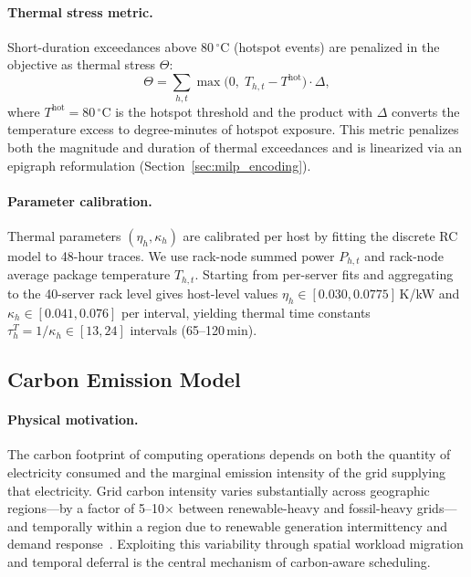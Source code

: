 \documentclass[a4paper,fleqn]{cas-dc}
\begin{document}
\paragraph{Thermal stress metric.}
Short-duration exceedances above 80$\,^{\circ}$C (hotspot events) are penalized in the objective as thermal stress $\Theta$:
\begin{equation}
\label{eq:thermal_stress}
\Theta = \sum_{h,t} \max\!\bigl(0,\; T_{h,t} - T^{\mathrm{hot}}\bigr) \cdot \Delta,
\end{equation}
where $T^{\mathrm{hot}} = 80\,^{\circ}$C is the hotspot threshold and the product with $\Delta$ converts the temperature excess to degree-minutes of hotspot exposure. This metric penalizes both the magnitude and duration of thermal exceedances and is linearized via an epigraph reformulation (Section~\ref{sec:milp_encoding}).

\paragraph{Parameter calibration.}
Thermal parameters $(\eta_h, \kappa_h)$ are calibrated per host by fitting the discrete RC model to 48-hour traces. We use rack-node summed power $P_{h,t}$ and rack-node average package temperature $T_{h,t}$. Starting from per-server fits and aggregating to the 40-server rack level gives host-level values $\eta_h \in [0.030, 0.0775]$\,K/kW and $\kappa_h \in [0.041, 0.076]$ per interval, yielding thermal time constants $\tau^{T}_h = 1/\kappa_h \in [13, 24]$ intervals (65--120\,min).

\subsection{Carbon Emission Model}
\label{sec:carbon_model}

\paragraph{Physical motivation.}
The carbon footprint of computing operations depends on both the quantity of electricity consumed and the marginal emission intensity of the grid supplying that electricity. Grid carbon intensity varies substantially across geographic regions---by a factor of 5--10$\times$ between renewable-heavy and fossil-heavy grids---and temporally within a region due to renewable generation intermittency and demand response~\cite{ref-radovanovic21,ref-le15}. Exploiting this variability through spatial workload migration and temporal deferral is the central mechanism of carbon-aware scheduling.
\end{document}
